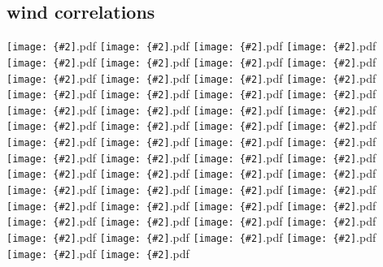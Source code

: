 \documentclass[12pt,a4paper]{article}
\newcommand{\pdffig}[2][0.5]{\texttt{[image: \{\#2]}.pdf}}
\begin{document}
\subsection{wind correlations}
\pdffig[0.5]{Correlation_Aus_tsfc_u_hig.mon}
\pdffig[0.5]{Correlation_Aus_tsfc_u_low.mon}
\pdffig[0.5]{Correlation_Aus_tsfc_v_high.mon}
\pdffig[0.5]{Correlation_Aus_tsfc_v_low.mon}
\pdffig[0.5]{Correlation_Aus_tsfc_w_high.mon}
\pdffig[0.5]{Correlation_Aus_tsfc_w_low.mon}
\pdffig[0.5]{Correlation_India_tsfc_u_hig.mon}
\pdffig[0.5]{Correlation_India_tsfc_u_low.mon}
\pdffig[0.5]{Correlation_India_tsfc_v_high.mon}
\pdffig[0.5]{Correlation_India_tsfc_v_low.mon}
\pdffig[0.5]{Correlation_India_tsfc_w_high.mon}
\pdffig[0.5]{Correlation_India_tsfc_w_low.mon}
\pdffig[0.5]{Correlation_MC_tsfc_u_hig.mon}
\pdffig[0.5]{Correlation_MC_tsfc_u_low.mon}
\pdffig[0.5]{Correlation_MC_tsfc_v_high.mon}
\pdffig[0.5]{Correlation_MC_tsfc_v_low.mon}
\pdffig[0.5]{Correlation_MC_tsfc_w_high.mon}
\pdffig[0.5]{Correlation_MC_tsfc_w_low.mon}
\pdffig[0.5]{Correlation_NthEastAfr_tsfc_u_hig.mon}
\pdffig[0.5]{Correlation_NthEastAfr_tsfc_u_low.mon}
\pdffig[0.5]{Correlation_NthEastAfr_tsfc_v_high.mon}
\pdffig[0.5]{Correlation_NthEastAfr_tsfc_v_low.mon}
\pdffig[0.5]{Correlation_NthEastAfr_tsfc_w_high.mon}
\pdffig[0.5]{Correlation_NthEastAfr_tsfc_w_low.mon}
\pdffig[0.5]{Correlation_NthWestAfr_tsfc_u_hig.mon}
\pdffig[0.5]{Correlation_NthWestAfr_tsfc_u_low.mon}
\pdffig[0.5]{Correlation_NthWestAfr_tsfc_v_high.mon}
\pdffig[0.5]{Correlation_NthWestAfr_tsfc_v_low.mon}
\pdffig[0.5]{Correlation_NthWestAfr_tsfc_w_high.mon}
\pdffig[0.5]{Correlation_NthWestAfr_tsfc_w_low.mon}
\pdffig[0.5]{Correlation_SthAfr_tsfc_u_hig.mon}
\pdffig[0.5]{Correlation_SthAfr_tsfc_u_low.mon}
\pdffig[0.5]{Correlation_SthAfr_tsfc_v_high.mon}
\pdffig[0.5]{Correlation_SthAfr_tsfc_v_low.mon}
\pdffig[0.5]{Correlation_SthAfr_tsfc_w_high.mon}
\pdffig[0.5]{Correlation_SthAfr_tsfc_w_low.mon}
\pdffig[0.5]{Correlation_SthSthAm_tsfc_u_hig.mon}
\pdffig[0.5]{Correlation_SthSthAm_tsfc_u_low.mon}
\pdffig[0.5]{Correlation_SthSthAm_tsfc_v_high.mon}
\pdffig[0.5]{Correlation_SthSthAm_tsfc_v_low.mon}
\pdffig[0.5]{Correlation_SthSthAm_tsfc_w_high.mon}
\pdffig[0.5]{Correlation_SthSthAm_tsfc_w_low.mon}
\pdffig[0.5]{Correlation_TropAfr_tsfc_u_hig.mon}
\pdffig[0.5]{Correlation_TropAfr_tsfc_u_low.mon}
\pdffig[0.5]{Correlation_TropAfr_tsfc_v_high.mon}
\pdffig[0.5]{Correlation_TropAfr_tsfc_v_low.mon}
\pdffig[0.5]{Correlation_TropAfr_tsfc_w_high.mon}
\pdffig[0.5]{Correlation_TropAfr_tsfc_w_low.mon}
\pdffig[0.5]{Correlation_TropSthAm_tsfc_u_hig.mon}
\pdffig[0.5]{Correlation_TropSthAm_tsfc_u_low.mon}
\pdffig[0.5]{Correlation_TropSthAm_tsfc_v_high.mon}
\pdffig[0.5]{Correlation_TropSthAm_tsfc_v_low.mon}
\pdffig[0.5]{Correlation_TropSthAm_tsfc_w_high.mon}
\pdffig[0.5]{Correlation_TropSthAm_tsfc_w_low.mon}
\end{document}
